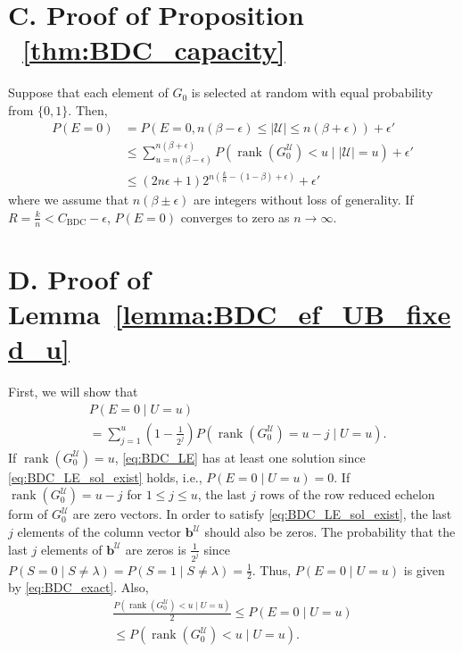 \documentclass[10pt,twocolumn,twoside,submit]{JCNtran}
\DeclareMathOperator{\rank}{rank}
\begin{document}
\section*{C. Proof of Proposition ~\ref{thm:BDC_capacity} \label{pf:BDC_capacity}}
		Suppose that each element of $G_0$ is selected at random with equal probability from $\{0, 1\}$. Then,
\begin{align}
P\left( E=0 \right) & = P\left( E=0, n(\beta - \epsilon) \le |{\mathcal{U}}| \le n(\beta + \epsilon) \right) + \epsilon' \nonumber\\
& \le \sum_{u=n(\beta - \epsilon)}^{n(\beta + \epsilon)}{P\left(\rank\left(G_0^{{\mathcal{U}}}\right) < u \mid |{\mathcal{U}}|=u\right)} + \epsilon'  \nonumber\\
& \le (2n\epsilon + 1) 2^{n \left( \frac{k}{n}  - (1 - \beta) + \epsilon\right)} + \epsilon' \label{eq:BDC_CA}
\end{align}
where we assume that $n(\beta \pm \epsilon)$ are integers without loss of generality. If $R = \frac{k}{n} < C_{\text{BDC}} - \epsilon$, $P\left( E=0 \right)$ converges to zero as $n \rightarrow \infty$. 

\section*{D. Proof of Lemma~\ref{lemma:BDC_ef_UB_fixed_u}\label{pf:BDC_ef_UB_fixed_u}}

	First, we will show that
	\begin{align}
		&P\left(E=0 \mid U=u\right)  \nonumber \\
		&= \sum_{j=1}^{u}{\left(1 - \frac{1}{2^j} \right)P \left( \rank \left( G_0^{\mathcal{U}} \right) =u - j \mid U=u \right)}.\label{eq:BDC_exact}
	\end{align}
	If $\rank \left( G_0^{\mathcal{U}} \right) = u$, \eqref{eq:BDC_LE} has at least one solution since \eqref{eq:BDC_LE_sol_exist} holds, i.e., $P\left(E=0 \mid U=u\right)=0$. If $\rank \left( G_0^{\mathcal{U}} \right) = u - j$ for $1 \le j \le u$, the last $j$ rows of the row reduced echelon form of $G_0^{\mathcal{U}}$ are zero vectors. In order to satisfy \eqref{eq:BDC_LE_sol_exist}, the last $j$ elements of the column vector $\mathbf{b}^{\mathcal{U}}$ should also be zeros. The probability that the last $j$ elements of $\mathbf{b}^{\mathcal{U}}$ are zeros is $\frac{1}{2^j}$ since $P(S=0 \mid S \ne \lambda) = P(S=1 \mid S \ne \lambda) = \frac{1}{2}$. Thus, $P\left(E=0 \mid U=u\right)$ is given by \eqref{eq:BDC_exact}. Also,
	\begin{align}
		\frac{P \left( \rank \left( G_0^{\mathcal{U}} \right) < u \mid U=u \right)}{2}
		 \le P\left(E=0 \mid U=u\right) \nonumber \\
		 \le P \left( \rank \left( G_0^{\mathcal{U}} \right) < u \mid U=u \right). \label{eq:enc_fail_upper0}
	\end{align}
	
\end{document}
